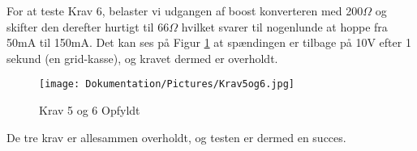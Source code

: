 \documentclass[../main.tex]{subfiles}
\begin{document}
For at teste Krav 6, belaster vi udgangen af boost konverteren med 200$\Omega$ og skifter den derefter hurtigt til 66$\Omega$ hvilket svarer til nogenlunde at hoppe fra 50mA til 150mA. Det kan ses på Figur \ref{fig: Krav 5 og 6 Opfyldt} at spændingen er tilbage på 10V efter 1 sekund (en grid-kasse), og kravet dermed er overholdt.

\begin{figure}[H]
      \texttt{[image: Dokumentation/Pictures/Krav5og6.jpg]}
     \caption{Krav 5 og 6 Opfyldt}
     \label{fig: Krav 5 og 6 Opfyldt}
     \end{figure}

De tre krav er allesammen overholdt, og testen er dermed en succes. 
\end{document}
